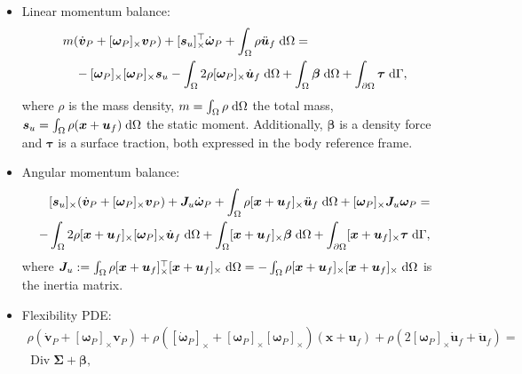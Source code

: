 \documentclass{svjour3}                     %
\DeclareMathOperator*{\Div}{Div}
\newcommand{\crmat}[1]{\ensuremath{[#1]_{\times}}}
\begin{document}
\begin{itemize}
	\item Linear momentum balance:
	\begin{equation}
	\label{eq:rig_tr1}
	\begin{split}
	&m (\dot{\bm{v}}_P + \crmat{\bm{\omega}_P} \bm{v}_P) + \crmat{\bm{s}_u}^\top \dot{\bm{\omega}}_P  + \int_{\Omega} \rho \ddot{\bm{u}}_f \d{\Omega} = \\
	&\quad - \crmat{\bm{\omega}_P} \crmat{\bm{\omega}_P} \bm{s}_u - \int_{\Omega} 2 \rho \crmat{\bm{\omega}_P} \dot{\bm{u}}_f \d{\Omega} +  \int_{\Omega} \bm\beta \d{\Omega} + \int_{\partial \Omega} \bm\tau \d{\Gamma},
	\end{split}
	\end{equation}
	where $\rho$ is the mass density, $m = \int_{\Omega} \rho \d{\Omega}$ the total mass,  $\bm{s}_u = \int_{\Omega} \rho (\bm{x}+\bm{u}_f) \d{\Omega}$ the static moment. Additionally, $\bm\beta$ is a density force and $\bm\tau$ is a surface traction, both expressed in the body reference frame.
	\item Angular momentum balance:
	\begin{equation}
	\label{eq:rig_rot1}
	\begin{split}
	\crmat{\bm{s}_u} (\dot{\bm{v}}_P + \crmat{\bm{\omega}_P} \bm{v}_P) + \bm{J}_u \dot{\bm\omega}_P + \int_{\Omega} \rho \crmat{\bm{x}+\bm{u}_f} \ddot{\bm{u}}_f \d{\Omega} + \crmat{\bm{\omega}_P} \bm{J}_u \bm{\omega}_P = \\ 
	- \int_{\Omega} 2\rho \crmat{\bm{x}+\bm{u}_f} \crmat{\bm\omega_P} \dot{\bm{u}}_f \d{\Omega} + \int_{\Omega}\crmat{\bm{x}+\bm{u}_f} \bm\beta \d{\Omega} + \int_{\partial \Omega}\crmat{\bm{x}+\bm{u}_f} \bm\tau \d{\Gamma}, \\
	\end{split}
	\end{equation}
	where $\bm{J}_u:= \int_{\Omega} \rho \crmat{\bm{x}+\bm{u}_f}^\top\crmat{\bm{x}+\bm{u}_f} \d{\Omega}= - \int_{\Omega} \rho \crmat{\bm{x}+\bm{u}_f}\crmat{\bm{x}+\bm{u}_f} \d{\Omega}$ is the inertia matrix.
	\item Flexibility PDE:
	\begin{equation}
	\label{eq:flex1}
	\begin{split}
	\rho (\dot{\bm{v}}_P + \crmat{\bm\omega_P} \bm{v}_P) + \rho (\crmat{\dot{\bm\omega}_P} + \crmat{\bm{\omega}_P}\crmat{\bm{\omega}_P})(\bm{x}+\bm{u}_f) + \rho (2 \crmat{\bm{\omega}_P} \dot{\bm{u}}_f + \ddot{\bm{u}}_f) = \\
	 \Div{\bm\Sigma} + \bm\beta,

\end{split}
\end{equation}
\end{itemize}
\end{document}
